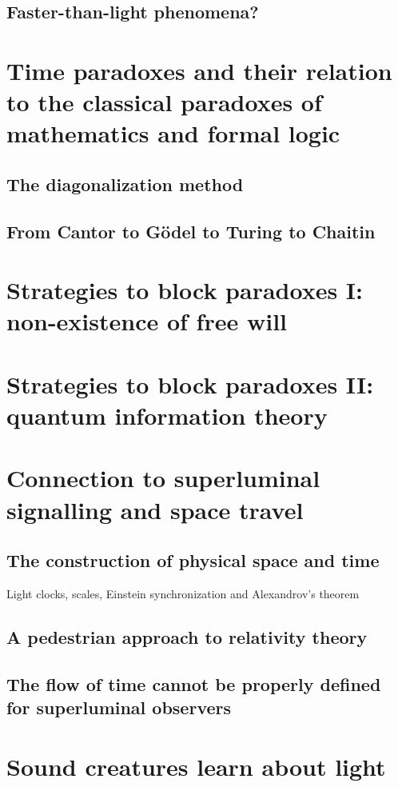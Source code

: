 \section{Faster-than-light phenomena?}


\chapter{Time paradoxes and their relation to the classical paradoxes of
mathematics and formal logic}
\section{The diagonalization method}
\section{From Cantor to G\"odel to Turing to Chaitin}

\chapter{Strategies to block paradoxes I: non-existence of free will}
\chapter{Strategies to block paradoxes II: quantum information theory}


\chapter{Connection to superluminal signalling and space travel}
\section{The construction of physical space and time}
Light clocks, scales, Einstein synchronization and Alexandrov's theorem
\section{A pedestrian approach to relativity theory}
\section{The flow of time cannot be properly defined for superluminal
observers}

\chapter{Sound creatures learn about light}
